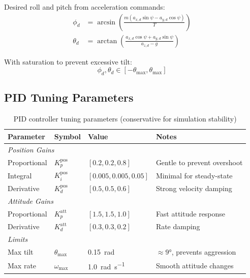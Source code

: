 Desired roll and pitch from acceleration commands:
\begin{align}
    \phi_d &= \arcsin\left(\frac{m(a_{x,d}\sin\psi - a_{y,d}\cos\psi)}{T}\right) \\
    \theta_d &= \arctan\left(\frac{a_{x,d}\cos\psi + a_{y,d}\sin\psi}{a_{z,d} - g}\right)
\end{align}

With saturation to prevent excessive tilt:
\begin{equation}
    \phi_d, \theta_d \in [-\theta_{\max}, \theta_{\max}]
\end{equation}

\subsection{PID Tuning Parameters}

\begin{table}[htbp]
    \centering
    \caption{PID controller tuning parameters (conservative for simulation stability)}
    \label{tab:pid_params}
    \begin{tabular}{@{}llll@{}}
        \toprule
        \textbf{Parameter} & \textbf{Symbol} & \textbf{Value} & \textbf{Notes} \\
        \midrule
        \multicolumn{4}{l}{\textit{Position Gains}} \\
        Proportional & $K_p^{\text{pos}}$ & $[0.2, 0.2, 0.8]$ & Gentle to prevent overshoot \\
        Integral & $K_i^{\text{pos}}$ & $[0.005, 0.005, 0.05]$ & Minimal for steady-state \\
        Derivative & $K_d^{\text{pos}}$ & $[0.5, 0.5, 0.6]$ & Strong velocity damping \\
        \midrule
        \multicolumn{4}{l}{\textit{Attitude Gains}} \\
        Proportional & $K_p^{\text{att}}$ & $[1.5, 1.5, 1.0]$ & Fast attitude response \\
        Derivative & $K_d^{\text{att}}$ & $[0.3, 0.3, 0.2]$ & Rate damping \\
        \midrule
        \multicolumn{4}{l}{\textit{Limits}} \\
        Max tilt & $\theta_{\max}$ & \SI{0.15}{\radian} & $\approx 9°$, prevents aggression \\
        Max rate & $\omega_{\max}$ & \SI{1.0}{\radian\per\second} & Smooth attitude changes \\
        \bottomrule
    \end{tabular}
\end{table}

